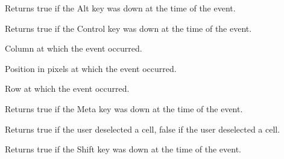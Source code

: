 
\label{wxgrideventaltdown}


Returns true if the Alt key was down at the time of the event.

\label{wxgrideventcontroldown}


Returns true if the Control key was down at the time of the event.

\label{wxgrideventgetcol}


Column at which the event occurred.

\label{wxgrideventgetposition}


Position in pixels at which the event occurred.

\label{wxgrideventgetrow}


Row at which the event occurred.

\label{wxgrideventmetadown}


Returns true if the Meta key was down at the time of the event.

\label{wxgrideventselecting}


Returns true if the user deselected a cell, false if the user
deselected a cell.

\label{wxgrideventshiftdown}


Returns true if the Shift key was down at the time of the event.

\section{}\label{wxgridrangeselectevent}



